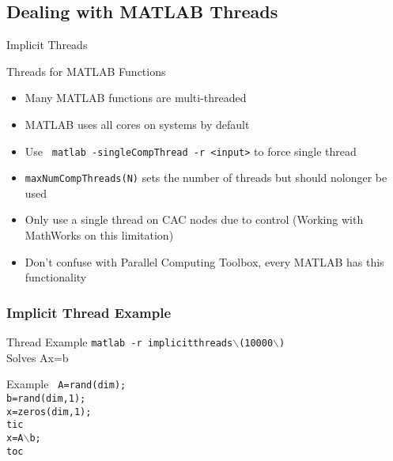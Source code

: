 \documentclass[handout]{beamer}
\begin{document}
   \subsection{Dealing with MATLAB Threads}
  \begin{frame}{Implicit Threads}
   \begin{block}{Threads for MATLAB Functions}
    \begin{itemize}
     \item Many MATLAB functions are multi-threaded
     \item MATLAB uses all cores on systems by default
     \item Use \texttt{ matlab -singleCompThread -r <input>} to force single thread
     \item \texttt{maxNumCompThreads(N)} sets the number of threads but should nolonger be used
     \item Only use a single thread on CAC nodes due to control (Working with MathWorks on this limitation)
     \item Don't confuse with Parallel Computing Toolbox, every MATLAB has this functionality
    \end{itemize}
   \end{block}
  \end{frame}

\begin{frame}[fragile]
\frametitle{Implicit Thread Example}
   \begin{block}{Thread Example}
\texttt{matlab -r implicitthreads$\backslash$(10000$\backslash$)} \\
Solves Ax=b
   \end{block}
   \begin{block}{Example}
    \texttt{
A=rand(dim); \\
b=rand(dim,1); \\
x=zeros(dim,1); \\
tic \\
x=A$\backslash$b;\\
toc  }
  \end{block}
\end{frame}
\end{document}

